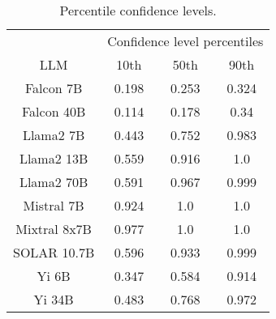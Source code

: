\begin{table*}
\centering
\begin{tabular}{c|c|c|c}
& \multicolumn{3}{c}{Confidence level percentiles} \\ 
LLM & 10th & 50th & 90th\\ \hline
Falcon 7B & 0.198 & 0.253 & 0.324\\
Falcon 40B & 0.114 & 0.178 & 0.34\\
Llama2 7B & 0.443 & 0.752 & 0.983\\
Llama2 13B & 0.559 & 0.916 & 1.0\\
Llama2 70B & 0.591 & 0.967 & 0.999\\
Mistral 7B & 0.924 & 1.0 & 1.0\\
Mixtral 8x7B & 0.977 & 1.0 & 1.0\\
SOLAR 10.7B & 0.596 & 0.933 & 0.999\\
Yi 6B & 0.347 & 0.584 & 0.914\\
Yi 34B & 0.483 & 0.768 & 0.972\\
\hline
\end{tabular}
\caption{Percentile confidence levels.}
\label{tab:percentile_conf}
\end{table*}
